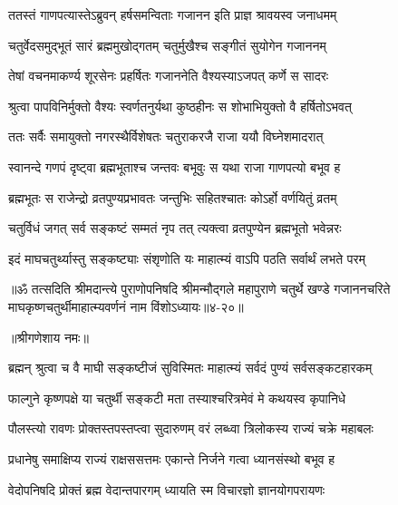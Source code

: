 \twolineshloka
{ततस्तं गाणपत्यास्तेऽब्रुवन् हर्षसमन्विताः}
{गजानन इति प्राज्ञ श्रावयस्व जनाधमम्} %

\twolineshloka
{चतुर्वेदसमुद्भूतं सारं ब्रह्ममुखोद्गतम्}
{चतुर्मुखैश्च सङ्गीतं सुयोगेन गजाननम्} %

\twolineshloka
{तेषां वचनमाकर्ण्य शूरसेनः प्रहर्षितः}
{गजाननेति वैश्यस्याऽजपत् कर्णे स सादरः} %

\twolineshloka
{श्रुत्वा पापविनिर्मुक्तो वैश्यः स्वर्णतनुर्यथा}
{कुष्ठहीनः स शोभाभियुक्तो वै हर्षितोऽभवत्} %

\twolineshloka
{ततः सर्वैः समायुक्तो नगरस्थैर्विशेषतः}
{चतुराकरजै राजा ययौ विघ्नेशमादरात्} %

\twolineshloka
{स्वानन्दे गणपं दृष्ट्वा ब्रह्मभूताश्च जन्तवः}
{बभूवुः स यथा राजा गाणपत्यो बभूव ह} %

\twolineshloka
{ब्रह्मभूतः स राजेन्द्रो व्रतपुण्यप्रभावतः}
{जन्तुभिः सहितश्चातः कोऽर्हो वर्णयितुं व्रतम्} %

\twolineshloka
{चतुर्विधं जगत् सर्व सङ्कष्टं सम्मतं नृप}
{तत् त्यक्त्वा व्रतपुण्येन ब्रह्मभूतो भवेन्नरः} %

\twolineshloka
{इदं माघचतुर्थ्यास्तु सङ्कष्ट्याः संश‍ृणोति यः}
{माहात्म्यं वाऽपि पठति सर्वार्थं लभते परम्} %

॥ॐ तत्सदिति श्रीमदान्त्ये पुराणोपनिषदि श्रीमन्मौद्गले महापुराणे चतुर्थे खण्डे गजाननचरिते माघकृष्णचतुर्थीमाहात्म्यवर्णनं नाम विंशोऽध्यायः॥४-२०॥


\label{sec:phalguna-krishna-chaturthi-mahatmya-varnanam}

\centerline{॥श्रीगणेशाय नमः॥}


\twolineshloka
{ब्रह्मन् श्रुत्वा च वै माघी सङ्कष्टीजं सुविस्मितः}
{माहात्म्यं सर्वदं पुण्यं सर्वसङ्कटहारकम्} %

\twolineshloka
{फाल्गुने कृष्णपक्षे या चतुर्थी सङ्कटी मता}
{तस्याश्चरित्रमेवं मे कथयस्व कृपानिधे} %


\twolineshloka
{पौलस्त्यो रावणः प्रोक्तस्तपस्तप्त्वा सुदारुणम्}
{वरं लब्ध्वा त्रिलोकस्य राज्यं चक्रे महाबलः} %

\twolineshloka
{प्रधानेषु समाक्षिप्य राज्यं राक्षससत्तमः}
{एकान्ते निर्जने गत्वा ध्यानसंस्थो बभूव ह} %

\twolineshloka
{वेदोपनिषदि प्रोक्तं ब्रह्म वेदान्तपारगम्}
{ध्यायति स्म विचारज्ञो ज्ञानयोगपरायणः} %

